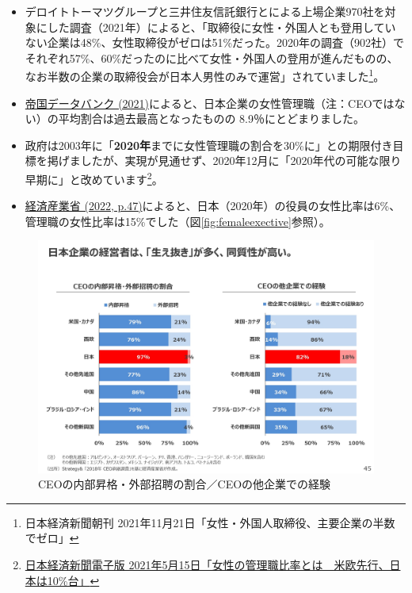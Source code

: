 \documentclass[
]{book}
\begin{document}
\begin{itemize}
\begin{itemize}
    \begin{itemize}
    \item
      デロイトトーマツグループと三井住友信託銀行とによる上場企業970社を対象にした調査（2021年）によると、「取締役に女性・外国人とも登用していない企業は48\%、女性取締役がゼロは51\%だった。2020年の調査（902社）でそれぞれ57\%、60\%だったのに比べて女性・外国人の登用が進んだものの、なお半数の企業の取締役会が日本人男性のみで運営」されていました\footnote{日本経済新聞朝刊 2021年11月21日「女性・外国人取締役、主要企業の半数でゼロ」}。
      　
    \item
      \href{https://www.tdb.co.jp/report/watching/press/p210805.html}{帝国データバンク (2021)}によると、日本企業の女性管理職（注：CEOではない）の平均割合は過去最高となったものの 8.9％にとどまりました。
    \item
      政府は2003年に「\textbf{2020年}までに女性管理職の割合を30\%に」との期限付き目標を掲げましたが、実現が見通せず、2020年12月に「2020年代の可能な限り早期に」と改めています\footnote{\href{https://www.nikkei.com/article/DGXZQOCC1454K0U1A510C2000000/}{日本経済新聞電子版 2021年5月15日「女性の管理職比率とは　米欧先行、日本は10\%台」}}。
    \item
      \href{https://www.meti.go.jp/press/2022/05/20220531001/20220531001-1.pdf}{経済産業省 (2022, p.47)}によると、日本（2020年）の役員の女性比率は6\%、管理職の女性比率は15\%でした（図\ref{fig:femaleexective}参照）。
    \end{itemize}
  \end{itemize}
\end{itemize}

\begin{figure}
\includegraphics[width=960px]{miti_page-0046} \caption{CEOの内部昇格・外部招聘の割合／CEOの他企業での経験}\label{fig:JPceo1}
\end{figure}
\end{document}

